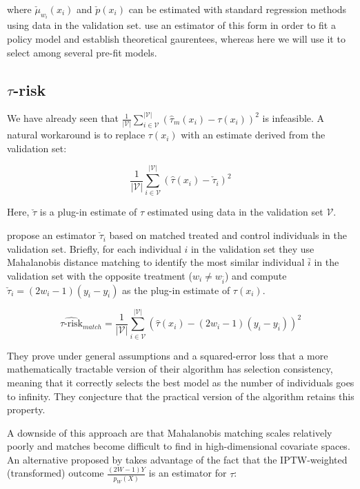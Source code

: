 where $\check\mu_{w_i}(x_i)$ and $\check p(x_i)$ can be estimated with standard regression methods using data in the validation set. \citet{Athey:wj} use an estimator of this form in order to fit a policy model and establish theoretical gaurentees, whereas here we will use it to select among several pre-fit models.

\subsection{$\tau$-risk}

We have already seen that $\frac{1}{|\mathcal{V}|}\sum_{i \in \mathcal{V}}^{|\mathcal{V}|}  (\hat \tau_m (x_i)- \tau(x_i))^2$ is infeasible. A natural workaround is to replace $\tau(x_i)$ with an estimate derived from the validation set:

\[
\frac{1}{|\mathcal{V}|}\sum_{i \in \mathcal{V}}^{|\mathcal{V}|}  (\hat \tau (x_i) -  \check \tau_i)^2
\]

Here, $\check \tau$ is a plug-in estimate of $\tau$ estimated using data in the validation set $\mathcal{V}$. 

\citet{Rolling:2013kz} propose an estimator $\check \tau_i$ based on matched treated and control individuals in the validation set. Briefly, for each individual $i$ in the validation set they use Mahalanobis distance matching to identify the most similar individual $\bar{i}$ in the validation set with the opposite treatment ($w_i \ne w_{\bar i}$) and compute $\check \tau_i = (2w_i -1)(y_i - y_{\bar i})$ as the plug-in estimate of $\tau(x_i)$. 

\begin{equation}
\widehat{\tau\text{-risk}}_{match} = \frac{1}{|\mathcal{V}|}\sum_{i \in \mathcal{V}}^{|\mathcal{V}|}  (\hat \tau (x_i) - (2w_i -1)(y_i - y_{\bar i}))^2
\label{trisk-match}
\end{equation}

They prove under general assumptions and a squared-error loss that a more mathematically tractable version of their algorithm has selection consistency, meaning that it correctly selects the best model as the number of individuals goes to infinity. They conjecture that the practical version of the algorithm retains this property.

A downside of this approach are that Mahalanobis matching scales relatively poorly and matches become difficult to find in high-dimensional covariate spaces. An alternative proposed by \citet{Gutierrez:2016tq} takes advantage of the fact that the IPTW-weighted (transformed) outcome $\frac{(2W-1)Y}{p_W(X)}$ is an estimator for $\tau$:

